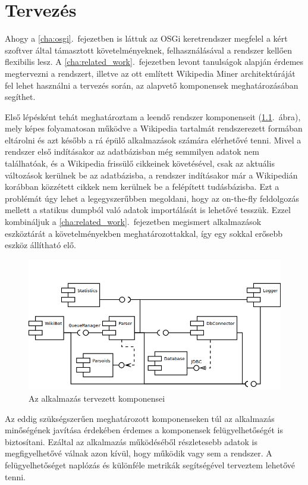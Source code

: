 \chapter{Tervezés}
\label{cha:design}

Ahogy a \ref{cha:osgi}.~fejezetben is láttuk az OSGi keretrendszer megfelel a kért szoftver által támasztott követelményeknek, felhasználásával a rendszer kellően flexibilis lesz. A \ref{cha:related_work}.~fejezetben levont tanulságok alapján érdemes megtervezni a rendszert, illetve az ott említett Wikipedia Miner architektúráját fel lehet használni a tervezés során, az alapvető komponensek meghatározásában segíthet.

Első lépésként tehát meghatároztam a leendő rendszer komponenseit (\ref{fig:componentdiagram}.~ábra), mely képes folyamatosan működve a Wikipedia tartalmát rendszerezett formában eltárolni és azt később a rá épülő alkalmazások számára elérhetővé tenni. Mivel a rendszer első indításakor az adatbázisban még semmilyen adatok nem találhatóak, és a Wikipedia frissülő cikkeinek követésével, csak az aktuális változások kerülnek be az adatbázisba, a rendszer indításakor már a Wikipedián korábban közzétett cikkek nem kerülnek be a felépített tudásbázisba. Ezt a problémát úgy lehet a legegyszerűbben megoldani, hogy az on-the-fly feldolgozás mellett a statikus dumpból való adatok importálását is lehetővé tesszük. Ezzel kombináljuk a \ref{cha:related_work}.~fejezetben megismert alkalmazások eszköztárát a követelményekben meghatározottakkal, így egy sokkal erősebb eszköz állítható elő.

\begin{figure}[htp]
\centering
\includegraphics[scale=0.5]{img/componentdiagram}
\caption{Az alkalmazás tervezett komponensei}
\label{fig:componentdiagram}
\end{figure}

Az eddig szükségszerűen meghatározott komponenseken túl az alkalmazás minőségének javítása érdekében érdemes a komponensek felügyelhetőségét is biztosítani. Ezáltal az alkalmazás működéséből részletesebb adatok is megfigyelhetővé válnak azon kívül, hogy működik vagy sem a rendszer. A felügyelhetőséget naplózás és különféle metrikák segítségével terveztem lehetővé tenni.

